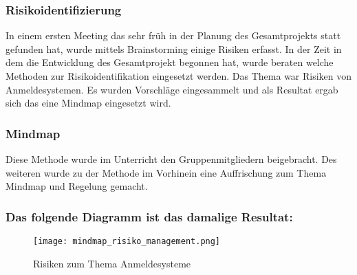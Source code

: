 \subsubsection{Risikoidentifizierung}
In einem ersten Meeting das sehr früh in der Planung des Gesamtprojekts statt gefunden hat, wurde mittels Brainstorming einige Risiken erfasst.
In der Zeit in dem die Entwicklung des Gesamtprojekt begonnen hat, wurde beraten welche Methoden zur Risikoidentifikation eingesetzt werden. Das Thema war Risiken von Anmeldesystemen. Es wurden Vorschläge eingesammelt und als Resultat ergab sich das eine Mindmap eingesetzt wird.

\subsubsection{Mindmap}
Diese Methode wurde im Unterricht den Gruppenmitgliedern beigebracht. Des weiteren wurde zu der Methode im Vorhinein eine Auffrischung zum Thema Mindmap und Regelung gemacht.
 
\subsubsection{Das folgende Diagramm ist das damalige Resultat:}
\begin{center}
\begin{figure}[h]
    \centering
    \texttt{[image: mindmap\_risiko\_management.png]}
    \caption{Risiken zum Thema Anmeldesysteme}
\end{figure}
\end{center}
